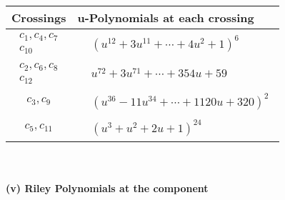 \documentclass[1p]{elsarticle_modified}
\theoremstyle{definition}
\begin{document}
\begin{tabular}{m{50pt}|m{274pt}}
Crossings & \hspace{64pt}u-Polynomials at each crossing \\
\hline $$\begin{aligned}c_{1},c_{4},c_{7}\\c_{10}\end{aligned}$$&$\begin{aligned}
&(u^{12}+3 u^{11}+\cdots+4 u^2+1)^{6}
\end{aligned}$\\
\hline $$\begin{aligned}c_{2},c_{6},c_{8}\\c_{12}\end{aligned}$$&$\begin{aligned}
&u^{72}+3 u^{71}+\cdots+354 u+59
\end{aligned}$\\
\hline $$\begin{aligned}c_{3},c_{9}\end{aligned}$$&$\begin{aligned}
&(u^{36}-11 u^{34}+\cdots+1120 u+320)^{2}
\end{aligned}$\\
\hline $$\begin{aligned}c_{5},c_{11}\end{aligned}$$&$\begin{aligned}
&(u^3+u^2+2 u+1)^{24}
\end{aligned}$\\
\hline
\end{tabular}\\~\\
\newpage\renewcommand{\arraystretch}{1}
\flushleft \textbf{(v) Riley Polynomials at the component}\newline \\
\end{document}
